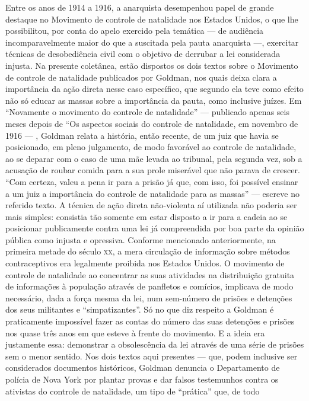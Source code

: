 Entre os anos de 1914 a 1916, a anarquista desempenhou papel de grande
destaque no Movimento de controle de natalidade nos Estados Unidos, o
que lhe possibilitou, por conta do apelo exercido pela temática --- de
audiência incomparavelmente maior do que a suscitada pela pauta
anarquista ---, exercitar técnicas de desobediência civil com o objetivo
de derrubar a lei considerada injusta. Na presente coletânea, estão
dispostos os dois textos sobre o Movimento de controle de natalidade
publicados por Goldman, nos quais deixa clara a importância da ação
direta nesse caso específico, que segundo ela teve como efeito não só
educar as massas sobre a importância da pauta, como inclusive juízes. Em
``Novamente o movimento do controle de natalidade'' --- publicado apenas
seis meses depois de ``Os aspectos sociais do controle de natalidade, em
novembro de 1916 --- , Goldman relata a história, então recente, de um
juiz que havia se posicionado, em pleno julgamento, de modo favorável ao
controle de natalidade, ao se deparar com o caso de uma mãe levada ao
tribunal, pela segunda vez, sob a acusação de roubar comida para a sua
prole miserável que não parava de crescer. ``Com certeza, valeu a pena
ir para a prisão já que, com isso, foi possível ensinar a um juiz a
importância do controle de natalidade para as massas'' --- escreve no
referido texto. A técnica de ação direta não-violenta aí utilizada não
poderia ser mais simples: consistia tão somente em estar disposto a ir
para a cadeia ao se posicionar publicamente contra uma lei já
compreendida por boa parte da opinião pública como injusta e opressiva.
Conforme mencionado anteriormente, na primeira metade do século \textsc{xx}, a
mera circulação de informação sobre métodos contraceptivos era
legalmente proibida nos Estados Unidos. O movimento de controle de
natalidade ao concentrar as suas atividades na distribuição gratuita de
informações à população através de panfletos e comícios, implicava de
modo necessário, dada a força mesma da lei, num sem-número de prisões e
detenções dos seus militantes e ``simpatizantes''. Só no que diz
respeito a Goldman é praticamente impossível fazer as contas do número
das suas detenções e prisões nos quase três anos em que esteve à frente
do movimento. E a ideia era justamente essa: demonstrar a obsolescência
da lei através de uma série de prisões sem o menor sentido. Nos dois
textos aqui presentes --- que, podem inclusive ser considerados
documentos históricos, Goldman denuncia o Departamento de polícia de
Nova York por plantar provas e dar falsos testemunhos contra os
ativistas do controle de natalidade, um tipo de ``prática'' que, de todo
